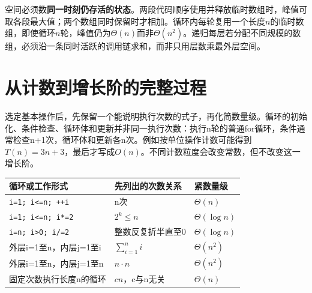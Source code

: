 空间必须数\textbf{同一时刻仍存活的状态}。两段代码顺序使用并释放临时数组时，峰值可取各段最大值；两个数组同时保留时才相加。循环内每轮复用一个长度\(n\)的临时数组，即使循环\(n\)轮，峰值仍为\(\Theta(n)\)而非\(\Theta(n^2)\)。递归每层若分配不同规模的数组，必须沿一条同时活跃的调用链求和，而非只用层数乘最外层空间。

\section{从计数到增长阶的完整过程}\label{DS01-count}

选定基本操作后，先保留一个能说明执行次数的式子，再化简数量级。循环的初始化、条件检查、循环体和更新并非同一执行次数：执行n轮的普通for循环，条件通常检查n+1次，循环体和更新各n次。例如按单位操作计数可能得到\(T(n)=3n+3\)，最后才写成\(O(n)\)。不同计数粒度会改变常数，但不改变这一增长阶。

\begin{wideblock}

\par\medskip\noindent\begin{minipage}{\linewidth}\fontsize{9.3}{12}\selectfont\begin{tabularx}{\linewidth}{@{}YYY@{}}
\toprule\noalign{}
循环或工作形式 & 先列出的次数关系 & 紧数量级 \\
\midrule\noalign{}


\texttt{i=\allowbreak{}1;\allowbreak{} i<\allowbreak{}=\allowbreak{}n;\allowbreak{} +\allowbreak{}+\allowbreak{}i} & n次 & \(\Theta(n)\) \\
\texttt{i=\allowbreak{}1;\allowbreak{} i<\allowbreak{}=\allowbreak{}n;\allowbreak{} i*\allowbreak{}=\allowbreak{}2} & \(2^k\le n\) & \(\Theta(\log n)\) \\
\texttt{i=\allowbreak{}n;\allowbreak{} i>\allowbreak{}0;\allowbreak{} i/\allowbreak{}=\allowbreak{}2} & 整数反复折半直至0 & \(\Theta(\log n)\) \\
外层i=1至n，内层j=1至i & \(\sum_{i=1}^n i\) & \(\Theta(n^2)\) \\
外层i=1至n，内层j=1至n & \(n\cdot n\) & \(\Theta(n^2)\) \\
固定次数执行长度n的循环 & \(c n\)，c与n无关 & \(\Theta(n)\) \\
\bottomrule\end{tabularx}
\end{minipage}\par\medskip

\end{wideblock}

